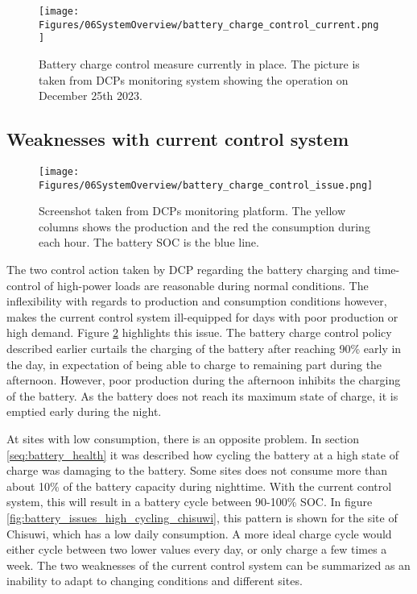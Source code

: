 \begin{figure}[h]
    \centering
    \texttt{[image: Figures/06SystemOverview/battery\_charge\_control\_current.png]}
    \caption[Current Battery charge control system]{Battery charge control measure currently in place. The picture is taken from DCPs monitoring system showing the operation on December 25th 2023.}
    \label{fig:battery_charge_control_current}
\end{figure}

\subsection{Weaknesses with current control system}\label{sec:weaknesses_current_syst}

\begin{figure}[h]
    \centering
    \texttt{[image: Figures/06SystemOverview/battery\_charge\_control\_issue.png]}
    \caption[Current control system weakness 1 - Battery Depletion]{Screenshot taken from DCPs monitoring platform. The yellow columns shows the production and the red the consumption during each hour. The battery SOC is the blue line.}
    \label{fig:battery_charge_control_issue}
\end{figure}

The two control action taken by DCP regarding the battery charging and time-control of high-power loads are reasonable during normal conditions. The inflexibility with regards to production and consumption conditions however, makes the current control system ill-equipped for days with poor production or high demand. Figure \ref{fig:battery_charge_control_issue} highlights this issue. The battery charge control policy described earlier curtails the charging of the battery after reaching 90\% early in the day, in expectation of being able to charge to remaining part during the afternoon. However, poor production during the afternoon inhibits the charging of the battery. As the battery does not reach its maximum state of charge, it is emptied early during the night. 

At sites with low consumption, there is an opposite problem. In section \ref{seq:battery_health} it was described how cycling the battery at a high state of charge was damaging to the battery. Some sites does not consume more than about 10\% of the battery capacity during nighttime. With the current control system, this will result in a battery cycle between 90-100\% SOC. In figure \ref{fig:battery_issues_high_cycling_chisuwi}, this pattern is shown for the site of Chisuwi, which has a low daily consumption. A more ideal charge cycle would either cycle between two lower values every day, or only charge a few times a week. The two weaknesses of the current control system can be summarized as an inability to adapt to changing conditions and different sites.

